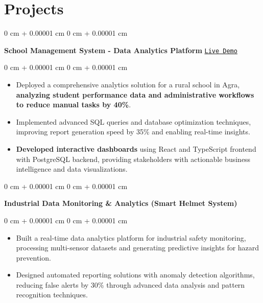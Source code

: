 \documentclass[10pt, letterpaper]{article}
\newenvironment{highlights}{ \begin{itemize}[ topsep=0.10 cm, parsep=0.10 cm, partopsep=0pt,
itemsep=0pt, leftmargin=0 cm + 10pt ] }{ \end{itemize} } %
\newenvironment{onecolentry}{ \begin{adjustwidth}{ 0 cm + 0.00001 cm }{ 0 cm + 0.00001 cm }
}{ \end{adjustwidth} } %
\begin{document}
	\section{Projects}

\begin{onecolentry}
		\textbf{School Management System - Data Analytics Platform} \hfill \href{https://stgdconventschool.com}{\texttt{Live Demo}}
\end{onecolentry}

\begin{onecolentry}
	\begin{highlights}
		\vspace{0.1cm}
		\item Deployed a comprehensive analytics solution for a rural school in Agra, \textbf{analyzing student performance data and administrative workflows to reduce manual tasks by 40\%}. \\
		\item Implemented advanced SQL queries and database optimization techniques, improving report generation speed by 35\% and enabling real-time insights. \\
		\item \textbf{Developed interactive dashboards} using React and TypeScript frontend with PostgreSQL backend, providing stakeholders with actionable business intelligence and data visualizations.
	\end{highlights}
\end{onecolentry}

\vspace{0.10 cm}
\begin{onecolentry}
		\textbf{Industrial Data Monitoring \& Analytics (Smart Helmet System)}
\end{onecolentry}
\begin{onecolentry}
	\begin{highlights}
	\vspace{0.10 cm}
		\item Built a real-time data analytics platform for industrial safety monitoring, processing multi-sensor datasets and generating predictive insights for hazard prevention. \\
		\item Designed automated reporting solutions with anomaly detection algorithms, reducing false alerts by 30\% through advanced data analysis and pattern recognition techniques.
	\end{highlights}
\end{onecolentry}
\end{document}
